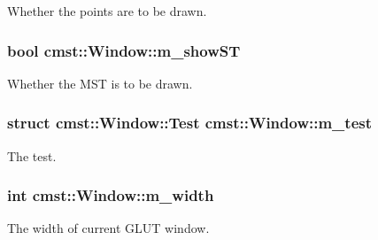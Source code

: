 Whether the points are to be drawn. 

\subsubsection[{\texorpdfstring{m\_showST}{m_showST}}]{\setlength{\rightskip}{0pt plus 5cm}bool cmst::Window::m\_showST\hspace{0.3cm}{\ttfamily [private]}}\hypertarget{classcmst_1_1_window_a8d8b71a285b5730cac0ce3fe63c91baf}{}\label{classcmst_1_1_window_a8d8b71a285b5730cac0ce3fe63c91baf}


Whether the MST is to be drawn. 

\subsubsection[{\texorpdfstring{m\_test}{m_test}}]{\setlength{\rightskip}{0pt plus 5cm}struct {\bf cmst::Window::Test}  cmst::Window::m\_test\hspace{0.3cm}{\ttfamily [protected]}}\hypertarget{classcmst_1_1_window_aedae466fb2efd886cea6d775b20fabe3}{}\label{classcmst_1_1_window_aedae466fb2efd886cea6d775b20fabe3}


The test. 

\subsubsection[{\texorpdfstring{m\_width}{m_width}}]{\setlength{\rightskip}{0pt plus 5cm}int cmst::Window::m\_width\hspace{0.3cm}{\ttfamily [private]}}\hypertarget{classcmst_1_1_window_a2955f1032cf2ab577a5f01776e46f671}{}\label{classcmst_1_1_window_a2955f1032cf2ab577a5f01776e46f671}


The width of current GLUT window. 

